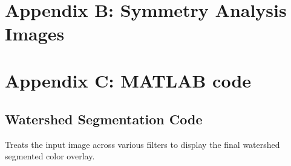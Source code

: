 \documentclass[12pt]{article}
\theoremstyle{plain}%
\theoremstyle{definition}
\theoremstyle{remark}
\begin{document}
\begin{figure}[!h]
	\centering
		\mbox{\quad
		}
\end{figure}

\section{Appendix B: Symmetry Analysis Images}

\section{Appendix C: MATLAB code}
\subsection{Watershed Segmentation Code}
Treats the input image across various filters to display the final watershed segmented color overlay.
\end{document}
